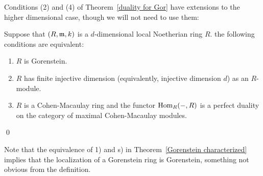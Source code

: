 \begin{fact}
Conditions (2) and (4) of Theorem~\ref{duality for Gor} have extensions to the higher dimensional case, though we will not need to use them:

\begin{theorem}\label{Gorenstein characterized}
 Suppose that $(R, \mathfrak m, k)$ is a $d$-dimensional local Noetherian ring $R$. the following conditions are equivalent:
\begin{enumerate}
\item $R$ is Gorenstein.
\item $R$ has finite injective dimension (equivalently, injective dimension $d$) as an $R$-module.
\item $R$ is a Cohen-Macaulay ring and the functor $\operatorname{Hom}_{R}(-,R)$ is a perfect duality on the category of maximal Cohen-Macaulay modules.
  \end{enumerate}  
  \qed
\end{theorem}
\end{fact}

Note that the equivalence of 1) and s) in Theorem~\ref{Gorenstein characterized} implies that the localization of a Gorenstein ring is Gorenstein, something not obvious from the definition.


